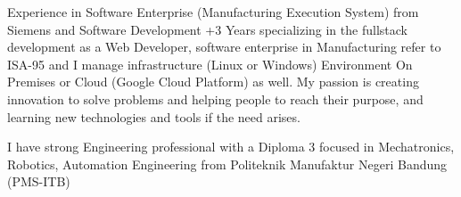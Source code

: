 

\begin{cvparagraph}

Experience in Software Enterprise (Manufacturing Execution System) from Siemens and Software Development +3 Years specializing in the fullstack development as a Web Developer, software enterprise in Manufacturing refer to ISA-95 and I manage infrastructure (Linux or Windows) Environment On Premises or Cloud (Google Cloud Platform) as well.
My passion is creating innovation to solve problems and helping people to reach their purpose, and learning new technologies and tools if the need arises.

I have strong Engineering professional with a Diploma 3 focused in Mechatronics, Robotics, Automation Engineering from Politeknik Manufaktur Negeri Bandung (PMS-ITB)
\end{cvparagraph}
